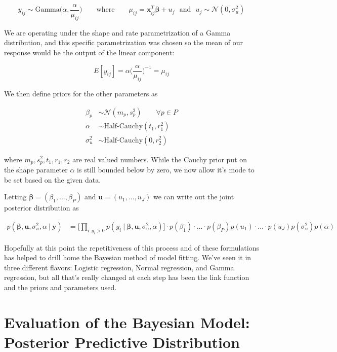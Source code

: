 \documentclass[12pt,twoside]{reedthesis}
\begin{document}
\[
y_{ij} \sim \text{Gamma}\bigg(\alpha, \frac{\alpha}{\mu_{ij}}\bigg) \qquad \text{where} \qquad \mu_{ij} = \mathbf{x}_{ij}^T\boldsymbol{\beta} + u_j \ \ \ \text{and} \ \ \ u_j  \sim \mathcal{N}(0, \sigma_{u}^2)
\]

We are operating under the shape and rate parametrization of a Gamma distribution, and this specific parametrization was chosen so the mean of our response would be the output of the linear component:

\[
E[y_{ij}] = \alpha \bigg(\frac{\alpha}{\mu_{ij}}\bigg)^{-1} = \mu_{ij}
\]

We then define priors for the other parameters as

\[
\begin{aligned}
\beta_p &\sim \mathcal{N}(m_p, s_p^2)  \qquad \forall p\in P \\
\alpha &\sim \text{Half-Cauchy}(t_1, r_1^2)\\
\sigma_{u}^2 &\sim \text{Half-Cauchy}(0, r_2^2)
\end{aligned}
\]

where \(m_p, s_p^2, t_1, r_1, r_2\) are real valued numbers. While the Cauchy prior put on the shape parameter \(\alpha\) is still bounded below by zero, we now allow it's mode to be set based on the given data.

Letting \(\boldsymbol{\beta} = (\beta_1, ..., \beta_P)\) and \(\mathbf{u} = (u_1, ..., u_J)\) we can write out the joint posterior distribution as

\[
\begin{aligned}
p(\boldsymbol{\beta}, \mathbf{u}, \sigma_{u}^2, \alpha \ | \ \mathbf{y}) &=\bigg[\prod_{i:y_{i} > 0}p(y_{i} \ | \ \boldsymbol{\beta},\mathbf{u}, \sigma_{u}^2, \alpha)\bigg]\cdot p(\beta_1)\cdot...\cdot p(\beta_P)p(u_1)\cdot ... \cdot p(u_J)p(\sigma_{u}^2)p( \alpha) 
\end{aligned}
\]

Hopefully at this point the repetitiveness of this process and of these formulations has helped to drill home the Bayesian method of model fitting. We've seen it in three different flavors: Logistic regression, Normal regression, and Gamma regression, but all that's really changed at each step has been the link function and the priors and parameters used.

\hypertarget{bayespred}{%
\section{Evaluation of the Bayesian Model: Posterior Predictive Distribution}\label{bayespred}}
\end{document}
